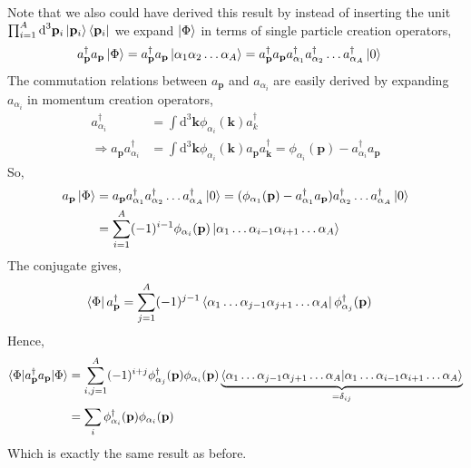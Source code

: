 \documentclass[10pt]{article}
\begin{document}
Note that we also could have derived this result by instead of inserting the unit $\prod_{i=1}^{A} \textrm{d}^{3} \mathbf{p}_{i} \ket{\mathbf{p}_{i}}\bra{\mathbf{p}_{i}}$ we expand $\ket{\Phi}$ in terms of single particle creation operators,
\begin{align}
	a_{\mathbf{p}}^{\dagger} a_{\mathbf{p}} \ket{\Phi} &= a_{\mathbf{p}}^{\dagger} a_{\mathbf{p}} \ket{ \alpha_1 \alpha_2 \ldots \alpha_A } = a_{\mathbf{p}}^{\dagger} a_{\mathbf{p}} a_{\alpha_1}^{\dagger} a_{\alpha_2}^{\dagger} \ldots a_{\alpha_A}^{\dagger} \ket{0}
\end{align}
The commutation relations between $a_{\mathbf{p}}$ and $a_{\alpha_i}$ are easily derived by expanding $a_{\alpha_i}$ in momentum creation operators,
\begin{align}
	a_{\alpha_i}^{\dagger} &= \int \textrm{d}^{3} \mathbf{k} \phi_{\alpha_i}(\mathbf{k}) a_{k}^{\dagger} \\
	\Rightarrow a_{\mathbf{p}} a_{\alpha_i}^{\dagger} &= \int \textrm{d}^{3} \mathbf{k} \phi_{\alpha_i}(\mathbf{k}) a_{\mathbf{p}} a_{\mathbf{k}}^{\dagger} = \phi_{\alpha_i}(\mathbf{p}) - a_{\alpha_i}^{\dagger} a_{\mathbf{p}}
\end{align}
So,
\begin{align}
	a_{\mathbf{p}} \ket{\Phi} &= a_{\mathbf{p}} a_{\alpha_1}^{\dagger} a_{\alpha_2}^{\dagger} \ldots a_{\alpha_A}^{\dagger} \ket{0} = (\phi_{\alpha_1}(\mathbf{p}) - a_{\alpha_1}^{\dagger} a_{\mathbf{p}}) a_{\alpha_2}^{\dagger} \ldots a_{\alpha_A}^{\dagger} \ket{0} \\
	&= \sum_{i=1}^{A} (-1)^{i-1} \phi_{\alpha_{i}}(\mathbf{p}) \ket{ \alpha_1 \ldots \alpha_{i-1} \alpha_{i+1} \ldots \alpha_A}
\end{align}
The conjugate gives,
\begin{align}
	\bra{\Phi} a_{\mathbf{p}}^{\dagger} &= \sum_{j=1}^{A} (-1)^{j-1} \bra{ \alpha_1 \ldots \alpha_{j-1} \alpha_{j+1} \ldots \alpha_A} \phi_{\alpha_j}^{\dagger}(\mathbf{p})
\end{align}
Hence,
\begin{align}
\braket{ \Phi | a_{\mathbf{p}}^{\dagger} a_{\mathbf{p}} | \Phi} &= \sum_{i,j=1}^{A} (-1)^{i+j} \phi_{\alpha_j}^{\dagger}(\mathbf{p}) \phi_{\alpha_{i}}(\mathbf{p})  \underbrace{\braket{ \alpha_1 \ldots \alpha_{j-1} \alpha_{j+1} \ldots \alpha_A | \alpha_1 \ldots \alpha_{i-1} \alpha_{i+1} \ldots \alpha_A }}_{=\delta_{ij}} \\
	&= \sum_{i} \phi_{\alpha_i}^{\dagger}(\mathbf{p}) \phi_{\alpha_{i}}(\mathbf{p})
\end{align}
Which is exactly the same result as before.
\end{document}

